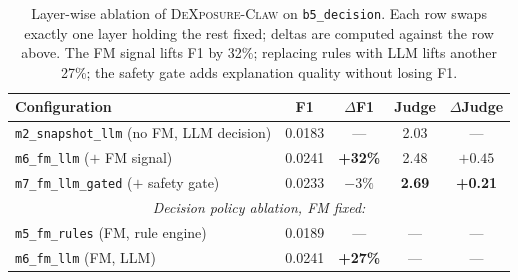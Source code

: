 \begin{table}[t]
\centering
\small
\setlength{\tabcolsep}{6pt}
\caption{Layer-wise ablation of \textsc{DeXposure-Claw} on
\texttt{b5\_decision}. Each row swaps exactly one layer holding the rest
fixed; deltas are computed against the row above. The FM signal lifts
F1 by 32\%; replacing rules with LLM lifts another 27\%; the safety
gate adds explanation quality without losing F1.}
\label{tab:b5_crisis}
\begin{tabular}{l c c c c}
\toprule
Configuration & F1 & $\Delta$F1 & Judge & $\Delta$Judge \\
\midrule
\texttt{m2\_snapshot\_llm} \quad (no FM, LLM decision)  & 0.0183 & ---            & 2.03 & ---     \\
\texttt{m6\_fm\_llm} \quad ($+$ FM signal)              & 0.0241 & \textbf{+32\%} & 2.48 & $+0.45$ \\
\texttt{m7\_fm\_llm\_gated} \quad ($+$ safety gate)     & 0.0233 & $-3\%$         & \textbf{2.69} & \textbf{+0.21} \\
\midrule
\multicolumn{5}{c}{\textit{Decision policy ablation, FM fixed:}} \\
\texttt{m5\_fm\_rules} \quad (FM, rule engine)          & 0.0189 & ---            & ---  & ---     \\
\texttt{m6\_fm\_llm} \quad (FM, LLM)                    & 0.0241 & \textbf{+27\%} & ---  & ---     \\
\bottomrule
\end{tabular}
\end{table}
